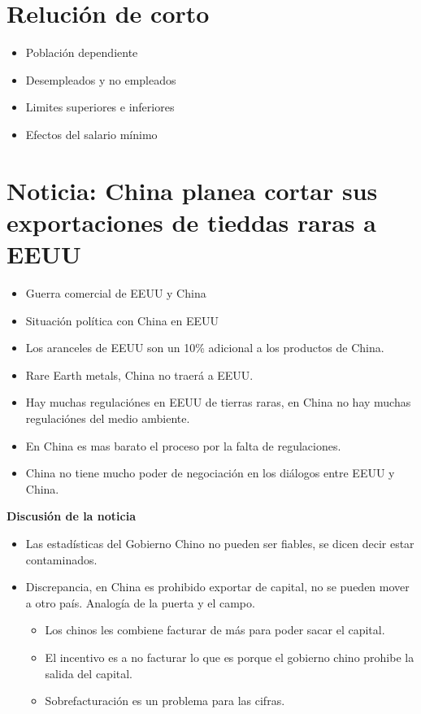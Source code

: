 \section{Relución de corto}
\begin{itemize}
    \item Población dependiente 
    \item Desempleados y no empleados
    \item Limites superiores e inferiores
    \item Efectos del salario mínimo
\end{itemize}

\section{Noticia: China planea cortar sus exportaciones de tieddas raras a EEUU}
\begin{itemize}
    \item Guerra comercial de EEUU y China
    \item Situación política con China en EEUU
    \item Los aranceles de EEUU son un 10\% adicional a los productos de China.
    \item Rare Earth metals, China no traerá a EEUU.
    \item Hay muchas regulaciónes en EEUU de tierras raras, en China no hay muchas regulaciónes del medio ambiente.
    \item En China es mas barato el proceso por la falta de regulaciones.
    \item China no tiene mucho poder de negociación en los diálogos entre EEUU y China.
\end{itemize}

\textbf{Discusión de la noticia}
\begin{itemize}
    \item Las estadísticas del Gobierno Chino no pueden ser fiables, se dicen decir estar contaminados.
    \item Discrepancia, en China es prohibido exportar de capital, no se pueden mover a otro país. Analogía de la puerta y el campo.
    \begin{itemize}
        \item Los chinos les combiene facturar de más para poder sacar el capital.
        \item El incentivo es a no facturar lo que es porque el gobierno chino prohibe la salida del capital.
        \item Sobrefacturación es un problema para las cifras.
    \end{itemize}
\end{itemize}


